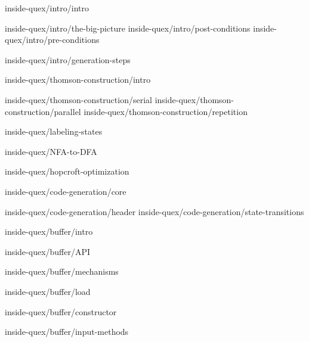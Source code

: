 \documentclass{scrbook}
\def\quex{{que{$\chi$}}}
\def\Quex{{Que{$\chi$}}}
\begin{document}
	    {inside-quex/intro/intro}

               {inside-quex/intro/the-big-picture}
                  {inside-quex/intro/post-conditions}
                  {inside-quex/intro/pre-conditions}

               {inside-quex/intro/generation-steps}

	    {inside-quex/thomson-construction/intro}
	  
  	          {inside-quex/thomson-construction/serial}
	          {inside-quex/thomson-construction/parallel}
	          {inside-quex/thomson-construction/repetition}

            {inside-quex/labeling-states}  

            {inside-quex/NFA-to-DFA}

	    {inside-quex/hopcroft-optimization}

            {inside-quex/code-generation/core}
	  
                  {inside-quex/code-generation/header}    
                  {inside-quex/code-generation/state-transitions}    

          {inside-quex/buffer/intro}

	      {inside-quex/buffer/API}

	      {inside-quex/buffer/mechanisms}
	      
	      {inside-quex/buffer/load}
	      
	      {inside-quex/buffer/constructor}

              {inside-quex/buffer/input-methods}



\end{document}
